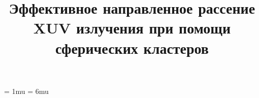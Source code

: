 \documentclass[10pt]{article}
\begin{document}



	\pagestyle{fancy}
	\fancyhf{}
	\fancyhead[L]{\textit{\nouppercase{\leftmark}}}
	\fancyfoot[C]{\thepage}

	\thinmuskip = 1mu
	\thickmuskip = 6mu

	\renewcommand{\equationautorefname}{}


	\title{Эффективное направленное рассение XUV излучения при помощи сферических кластеров}
	\author{}
	\maketitle

	
	
	
	

	
	
\end{document}
